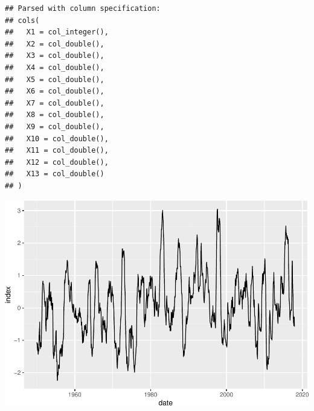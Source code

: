 \documentclass[]{article}
\newenvironment{Shaded}{\begin{snugshade}}{\end{snugshade}}
\newcommand{\CommentTok}[1]{\textcolor[rgb]{0.56,0.35,0.01}{\textit{#1}}}
\newcommand{\DataTypeTok}[1]{\textcolor[rgb]{0.13,0.29,0.53}{#1}}
\newcommand{\DecValTok}[1]{\textcolor[rgb]{0.00,0.00,0.81}{#1}}
\newcommand{\KeywordTok}[1]{\textcolor[rgb]{0.13,0.29,0.53}{\textbf{#1}}}
\newcommand{\NormalTok}[1]{#1}
\newcommand{\OperatorTok}[1]{\textcolor[rgb]{0.81,0.36,0.00}{\textbf{#1}}}
\newcommand{\StringTok}[1]{\textcolor[rgb]{0.31,0.60,0.02}{#1}}
\begin{document}
\begin{verbatim}
## Parsed with column specification:
## cols(
##   X1 = col_integer(),
##   X2 = col_double(),
##   X3 = col_double(),
##   X4 = col_double(),
##   X5 = col_double(),
##   X6 = col_double(),
##   X7 = col_double(),
##   X8 = col_double(),
##   X9 = col_double(),
##   X10 = col_double(),
##   X11 = col_double(),
##   X12 = col_double(),
##   X13 = col_double()
## )
\end{verbatim}

\begin{Shaded}
\end{Shaded}

\includegraphics{R_tidyverse_for_geographers_files/figure-latex/unnamed-chunk-13-1.pdf}
\end{document}
